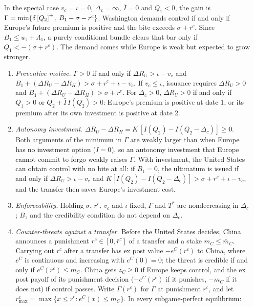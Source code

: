 In the special case $v_c=\iota=0$, $\Delta_c=\infty$, $\bar I=0$ and $Q_1<0$, the gain is $\Gamma=\min\{\delta\left[Q_2\right]^{+},\,B_1-\sigma-r^c\}$. Washington demands control if and only if Europe's future premium is positive and the bite exceeds $\sigma+r^c$. Since $B_1\le u_1+\Lambda_1$, a purely conditional bundle clears that bar only if $Q_1<-(\sigma+r^c)$. The demand comes while Europe is weak but expected to grow stronger.

\begin{corollary}\label{cor:control}
\leavevmode
\begin{enumerate}[label=(\alph*)]
\item \emph{Preventive motive.} $\Gamma>0$ if and only if $\Delta R_U>\iota-v_c$ and $B_1+(\Delta R_U-\Delta R_H)>\sigma+r^c+\iota-v_c$. If $v_c\le\iota$, issuance requires $\Delta R_U>0$ and $B_1+(\Delta R_U-\Delta R_H)>\sigma+r^c$. For $\Delta_c>0$, $\Delta R_U>0$ if and only if $Q_1>0$ or $Q_2+\bar I\,I(Q_2)>0$: Europe's premium is positive at date 1, or its premium after its own investment is positive at date 2.
\item \emph{Autonomy investment.} $\Delta R_U-\Delta R_H=K\,[I(Q_2)-I(Q_2-\Delta_c)]\ge 0$. Both arguments of the minimum in $\Gamma$ are weakly larger than when Europe has no investment option ($\bar I=0$), so an autonomy investment that Europe cannot commit to forgo weakly raises $\Gamma$. With investment, the United States can obtain control with no bite at all: if $B_1=0$, the ultimatum is issued if and only if $\Delta R_U>\iota-v_c$ and $K[I(Q_2)-I(Q_2-\Delta_c)]>\sigma+r^c+\iota-v_c$, and the transfer then saves Europe's investment cost.
\item \emph{Enforceability.} Holding $\sigma$, $r^c$, $v_c$ and $\iota$ fixed, $\Gamma$ and $T^*$ are nondecreasing in $\Delta_c$; $B_1$ and the credibility condition do not depend on $\Delta_c$.
\item \emph{Counter-threats against a transfer.} Before the United States decides, China announces a punishment $r^c\in[0,\bar r^c]$ of a transfer and a stake $m_C\le\bar m_C$. Carrying out $r^c$ after a transfer has ex post value $-e^C(r^c)$ to China, where $e^C$ is continuous and increasing with $e^C(0)=0$; the threat is credible if and only if $e^C(r^c)\le m_C$. China gets $z_C\ge 0$ if Europe keeps control, and the ex post payoff of its punishment decision ($-e^C(r^c)$ if it punishes, $-m_C$ if it does not) if control passes. Write $\Gamma(r^c)$ for $\Gamma$ at punishment $r^c$, and let $r^c_{\max}=\max\{x\le\bar r^c:e^C(x)\le\bar m_C\}$. In every subgame-perfect equilibrium:

\end{enumerate}
\end{corollary}
